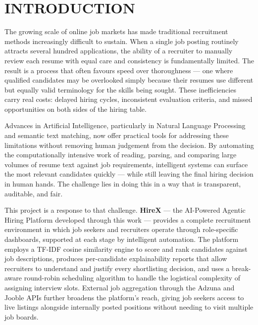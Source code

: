 \documentclass[12pt,a4paper]{report}
\renewcommand{\headrulewidth}{0.4pt}
\renewcommand{\footrulewidth}{0.4pt}
\renewcommand{\headrulewidth}{0pt}
\renewcommand{\footrulewidth}{0.4pt}
\begin{document}
\hypersetup{pageanchor=true}
\pagestyle{fancy}
\fancyhf{}
\fancyhead[R]{\small\textit{\leftmark}}
\fancyfoot[R]{\thepage}
\renewcommand{\headrulewidth}{0.4pt}
\renewcommand{\footrulewidth}{0.4pt}

\chapter{INTRODUCTION}

The growing scale of online job markets has made traditional recruitment methods increasingly difficult to sustain. When a single job posting routinely attracts several hundred applications, the ability of a recruiter to manually review each resume with equal care and consistency is fundamentally limited. The result is a process that often favours speed over thoroughness — one where qualified candidates may be overlooked simply because their resumes use different but equally valid terminology for the skills being sought. These inefficiencies carry real costs: delayed hiring cycles, inconsistent evaluation criteria, and missed opportunities on both sides of the hiring table.

Advances in Artificial Intelligence, particularly in Natural Language Processing and semantic text matching, now offer practical tools for addressing these limitations without removing human judgement from the decision. By automating the computationally intensive work of reading, parsing, and comparing large volumes of resume text against job requirements, intelligent systems can surface the most relevant candidates quickly — while still leaving the final hiring decision in human hands. The challenge lies in doing this in a way that is transparent, auditable, and fair.

This project is a response to that challenge. \textbf{HireX} — the AI-Powered Agentic Hiring Platform developed through this work — provides a complete recruitment environment in which job seekers and recruiters operate through role-specific dashboards, supported at each stage by intelligent automation. The platform employs a TF-IDF cosine similarity engine to score and rank candidates against job descriptions, produces per-candidate explainability reports that allow recruiters to understand and justify every shortlisting decision, and uses a break-aware round-robin scheduling algorithm to handle the logistical complexity of assigning interview slots. External job aggregation through the Adzuna and Jooble APIs further broadens the platform's reach, giving job seekers access to live listings alongside internally posted positions without needing to visit multiple job boards.
\end{document}

